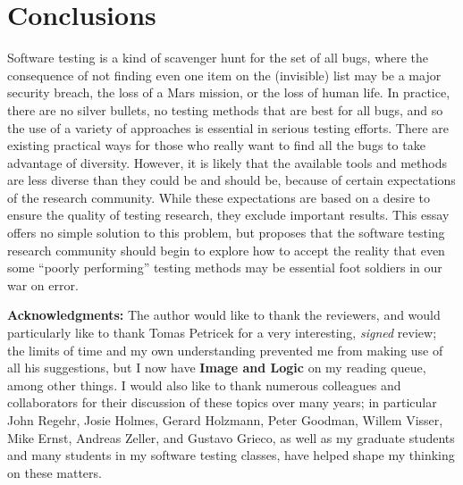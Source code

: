 \documentclass[sigplan]{acmart}
\begin{document}
\section{Conclusions}

Software testing is a kind of scavenger hunt for the set of all bugs,
where the consequence of not finding even one item on the (invisible)
list may be a major security breach, the loss of a Mars mission, or
the loss of human life.  In practice, there are no silver bullets, no
testing methods that are best for all bugs, and so the use of a
variety of approaches is essential in serious testing efforts.  There
are existing practical ways for those who really want to find all the
bugs to take advantage of diversity.  However, it is likely that the
available tools and methods are less diverse than they could be and
should be, because of certain expectations of the research community.
While these expectations are based on a desire to ensure the quality
of testing research, they exclude important results.   This essay
offers no simple solution to this problem, but proposes that the
software testing research community should begin to explore how to
accept the reality that even some ``poorly performing'' testing methods may
be essential foot soldiers in our war on error.

{\bf Acknowledgments:} The author would like to thank the 
reviewers, and would particularly like to thank Tomas Petricek for a
very interesting, \emph{signed} review; the limits of time and my own
understanding prevented me from making use of all his suggestions, but
I now have {\bf Image and Logic} on my reading queue, among other
things.  I would also like to thank numerous colleagues and
collaborators for their discussion of these topics over many years; in
particular John Regehr, Josie Holmes, Gerard Holzmann, Peter Goodman,
Willem Visser, Mike Ernst, Andreas Zeller, and
Gustavo Grieco, as well as my graduate students and many students in my
software testing classes, have helped shape my thinking on these matters.



\end{document}

